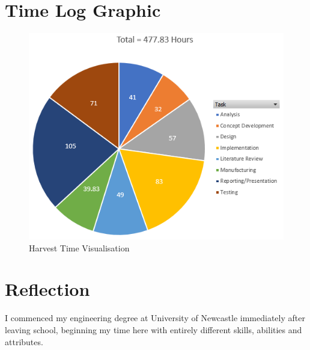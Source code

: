 \documentclass{UoNMCHA}
\numberwithin{equation}{section}
\begin{document}
\newpage
\appendix
\captionsetup[figure]{list=no}
\section{Time Log Graphic}
    \begin{figure}[H]
        \centering
        \includegraphics[keepaspectratio, width = \textwidth]{Figures/TimeLog.png}
        \caption{Harvest Time Visualisation}
    \end{figure}

\newpage
\section{Reflection}
    
    I commenced my engineering degree at University of Newcastle immediately after leaving school, beginning my time here with entirely different skills, abilities and attributes.
    
\end{document}
